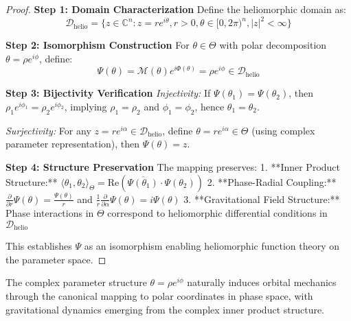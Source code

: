 \begin{proof}
\textbf{Step 1: Domain Characterization}
Define the heliomorphic domain as:
$$\mathcal{D}_{\text{helio}} = \{z \in \mathbb{C}^n : z = re^{i\theta}, r > 0, \theta \in [0,2\pi)^n, |z|^2 < \infty\}$$

\textbf{Step 2: Isomorphism Construction}
For $\theta \in \Theta$ with polar decomposition $\theta = \rho e^{i\phi}$, define:
$$\Psi(\theta) = \mathcal{M}(\theta)e^{i\Phi(\theta)} = \rho e^{i\phi} \in \mathcal{D}_{\text{helio}}$$

\textbf{Step 3: Bijectivity Verification}
\textit{Injectivity:} If $\Psi(\theta_1) = \Psi(\theta_2)$, then $\rho_1 e^{i\phi_1} = \rho_2 e^{i\phi_2}$, implying $\rho_1 = \rho_2$ and $\phi_1 = \phi_2$, hence $\theta_1 = \theta_2$.

\textit{Surjectivity:} For any $z = re^{i\alpha} \in \mathcal{D}_{\text{helio}}$, define $\theta = re^{i\alpha} \in \Theta$ (using complex parameter representation), then $\Psi(\theta) = z$.

\textbf{Step 4: Structure Preservation}
The mapping preserves:
1. **Inner Product Structure:** $\langle \theta_1, \theta_2 \rangle_\Theta = \text{Re}(\overline{\Psi(\theta_1)} \cdot \Psi(\theta_2))$
2. **Phase-Radial Coupling:** $\frac{\partial}{\partial r}\Psi(\theta) = \frac{\Psi(\theta)}{r}$ and $\frac{1}{r}\frac{\partial}{\partial \alpha}\Psi(\theta) = i\Psi(\theta)$
3. **Gravitational Field Structure:** Phase interactions in $\Theta$ correspond to heliomorphic differential conditions in $\mathcal{D}_{\text{helio}}$

This establishes $\Psi$ as an isomorphism enabling heliomorphic function theory on the parameter space.
\end{proof}

\begin{theorem}
\label{thm:orbital_mechanics_connection}
The complex parameter structure $\theta = \rho e^{i\phi}$ naturally induces orbital mechanics through the canonical mapping to polar coordinates in phase space, with gravitational dynamics emerging from the complex inner product structure.
\end{theorem}

